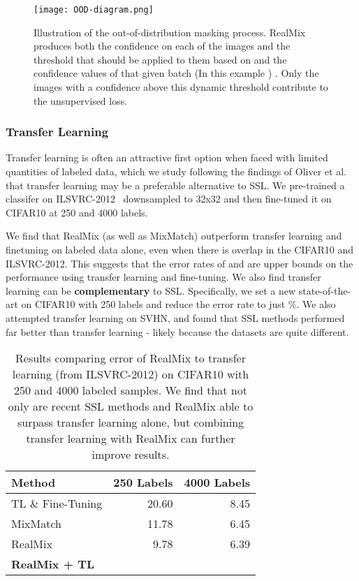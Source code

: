 \documentclass[10pt,twocolumn,letterpaper]{article}
\begin{document}
\begin{figure}[t!]
    \texttt{[image: OOD-diagram.png]}
    \caption{Illustration of the out-of-distribution masking process. RealMix produces both the confidence on each of the images and the threshold that should be applied to them based on  and the confidence values of that given batch (In this example ) . Only the images with a confidence above this dynamic threshold contribute to the unsupervised loss.}
    \label{fig:OOD-diagram}
\end{figure}

\subsubsection{Transfer Learning}
\label{transferleanring}

Transfer learning is often an attractive first option when faced with limited quantities of labeled data, which we study following the findings of Oliver et al.\cite{realisticevalOliver} that transfer learning may be a preferable alternative to SSL. We pre-trained a classifer on ILSVRC-2012~\cite{imagenet} downsampled to 32x32 and then fine-tuned it on CIFAR10 at 250 and 4000 labels.

We find that RealMix (as well as MixMatch) outperform transfer learning and finetuning on labeled data alone, even when there is overlap in the CIFAR10 and ILSVRC-2012. This suggests that the error rates of  and  are upper bounds on the performance using transfer learning and fine-tuning. We also find transfer learning can be \textbf{complementary} to SSL. Specifically, we set a new state-of-the-art on CIFAR10 with 250 labels and reduce the error rate to just \%. We also attempted transfer learning on SVHN, and found that SSL methods performed far better than transfer learning - likely because the datasets are quite different. 

\begin{center}
    \begin{table}[h]
\centering
\begin{tabular}{lrr}
    \hline
      Method & 250 Labels & 4000 Labels \\ \hline
      TL \& Fine-Tuning & 20.60 & 8.45\\
      MixMatch\cite{mixmatchBerthelot} & 11.78 & 6.45\\
      RealMix & 9.78 & 6.39 \\\hline
      \textbf{RealMix + TL} &  &  \\
\end{tabular}
\caption{Results comparing error of RealMix to transfer learning (from ILSVRC-2012) on CIFAR10 with 250 and 4000 labeled samples. We find that not only are recent SSL methods and RealMix able to surpass transfer learning alone, but combining transfer learning with RealMix can further improve results.}
\vskip -0.3in
\end{table}
\end{center}
\end{document}
